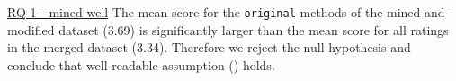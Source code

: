 \documentclass[%
class=scrreprt,
chapterprefix=false,%
open=right,%
twoside=false,%
paper=a4,%
logofile={Logo\_zentral\_farbig\_EN.png},%
thesistype=master,%
UKenglish,%
]{se2thesis}
\theoremstyle{definition}
\begin{document}

	\begin{summary}{\hyperref[mined-well]{RQ 1 - mined-well}}
		The mean score for the \texttt{original} methods of the mined-and-modified dataset (3.69) is significantly larger than the mean score for all ratings in the merged dataset (3.34). Therefore we reject the null hypothesis and conclude that well readable assumption () holds.
	\end{summary}
	
\end{document}
